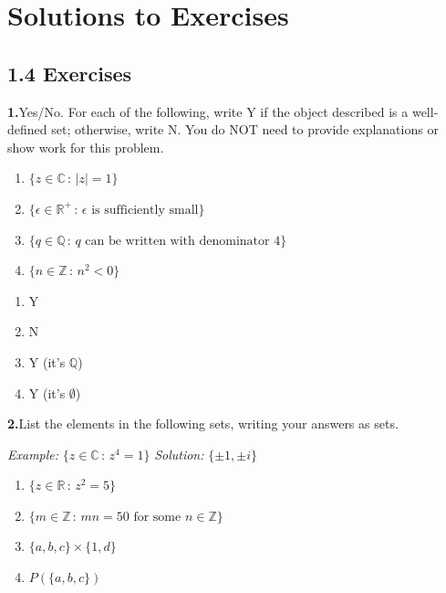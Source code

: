 \documentclass[10pt,]{book}
\theoremstyle{plain}
\theoremstyle{definition}
\theoremstyle{definition}
\theoremstyle{definition}
\theoremstyle{definition}
\numberwithin{equation}{section}
\def\Z{\mathbb{Z}}
\def\R{\mathbb{R}}
\def\Q{\mathbb{Q}}
\def\C{\mathbb{C}}
\newcommand{\lt}{<}
\begin{document}
\chapter[{Solutions to Exercises}]{Solutions to Exercises}\label{appendix-2}
\section*{1.4 Exercises}
\noindent\textbf{1.}\quad{}Yes/No. For each of the following, write Y if the object described is a well-defined set; otherwise, write N. You do NOT need to provide explanations or show work for this problem. \leavevmode%
\begin{enumerate}[label=(\alph*)]
\item\hypertarget{li-23}{}\(\{z \in \C \,:\, |z|=1\}\)%
\item\hypertarget{li-24}{}\(\{\epsilon \in \R^+\,:\, \epsilon \mbox{ is sufficiently small} \}\)%
\item\hypertarget{li-25}{}\(\{q\in \Q \,:\, q \mbox{ can be written  with denominator } 4\}\)%
\item\hypertarget{li-26}{}\(\{n \in \Z\,:\, n^2 \lt 0\}\)%
\end{enumerate}
%
\par\smallskip
\leavevmode%
\begin{multicols}{4}
\begin{enumerate}[label=(\alph*)]
\item\hypertarget{li-27}{}Y%
\item\hypertarget{li-28}{}N%
\item\hypertarget{li-29}{}Y (it's \(\Q\))%
\item\hypertarget{li-30}{}Y (it's \(\emptyset\))%
\end{enumerate}
\end{multicols}
\par\smallskip
\noindent\textbf{2.}\quad{}List the elements in the following sets, writing your answers as sets.%
\par
\emph{Example:} \(\{z\in \C\,:\,z^4=1\}\) \emph{Solution:} \(\{\pm 1, \pm i\}\) \leavevmode%
\begin{enumerate}[label=(\alph*)]
\item\hypertarget{li-31}{}\(\{z\in \R\,:\, z^2=5\}\)%
\item\hypertarget{li-32}{}\(\{m \in \Z\,:\, mn=50 \mbox{ for some } n\in \Z\}\)%
\item\hypertarget{li-33}{}\(\{a,b,c\}\times \{1,d\}\)%
\item\hypertarget{li-34}{}\(P(\{a,b,c\})\)%
\end{enumerate}
\end{document}
